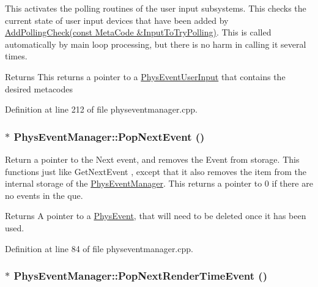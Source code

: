 This activates the polling routines of the user input subsystems. This checks the current state of user input devices that have been added by \hyperlink{classPhysEventManager_a1e99385441c5377a741561db581ef3ae}{AddPollingCheck(const MetaCode \&InputToTryPolling)}. This is called automatically by main loop processing, but there is no harm in calling it several times. \begin{DoxyReturn}{Returns}
This returns a pointer to a \hyperlink{classPhysEventUserInput}{PhysEventUserInput} that contains the desired metacodes 
\end{DoxyReturn}


Definition at line 212 of file physeventmanager.cpp.\hypertarget{classPhysEventManager_a3122b32172326ac32cfecc828b820977}{
\subsubsection[{PopNextEvent}]{ $\ast$ PhysEventManager::PopNextEvent ()}}
\label{d5/dd7/classPhysEventManager_a3122b32172326ac32cfecc828b820977}


Return a pointer to the Next event, and removes the Event from storage. This functions just like GetNextEvent , except that it also removes the item from the internal storage of the \hyperlink{classPhysEventManager}{PhysEventManager}. This returns a pointer to 0 if there are no events in the que. \begin{DoxyReturn}{Returns}
A pointer to a \hyperlink{classPhysEvent}{PhysEvent}, that will need to be deleted once it has been used. 
\end{DoxyReturn}


Definition at line 84 of file physeventmanager.cpp.\hypertarget{classPhysEventManager_ad627925363fdbcff98e0faef204e81e2}{
\subsubsection[{PopNextRenderTimeEvent}]{ $\ast$ PhysEventManager::PopNextRenderTimeEvent ()}}
\label{d5/dd7/classPhysEventManager_ad627925363fdbcff98e0faef204e81e2}


